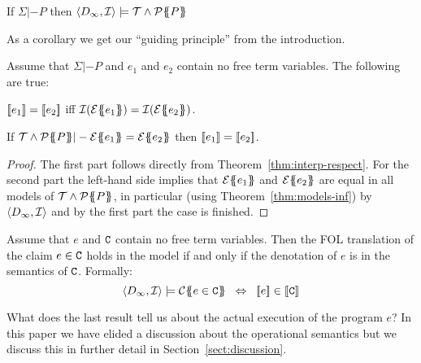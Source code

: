 \begin{theorem}\label{thm:models-inf}
If $\Sigma |- P$ then $\langle D_{\infty},{\cal I}\rangle \models {\cal T} \land {\cal P}\{\!\!\{P\}\!\!\}$
\end{theorem}
As a corollary we get our ``guiding principle'' from the introduction.
\begin{corollary}\label{cor:guiding-principle}
Assume that $\Sigma |- P$ and $e_1$ and $e_2$ contain no free term variables. The following
are true:
\begin{itemize*}
  \item $[\![e_1]\!] = [\![e_2]\!]$ iff ${\cal I}(\etrans{}{}{e_1}) = {\cal I}(\etrans{}{}{e_2})$.
  \item If $\Th \land \ptrans{\Sigma}{P} |- \etrans{}{}{e_1} = \etrans{}{}{e_2}$ then $[\![e_1]\!] = [\![e_2]\!]$.
\end{itemize*}
\end{corollary}
\begin{proof} The first part follows directly from Theorem~\ref{thm:interp-respect}.
For the second part the left-hand side implies that ${\cal E}\{\!\!\{e_1\}\!\!\}$ and ${\cal E}\{\!\!\{e_2\}\!\!\}$ are
equal in all models of ${\cal T} \land {\cal P}\{\!\!\{P\}\!\!\}$, in particular (using Theorem~\ref{thm:models-inf})
by $\langle D_{\infty},{\cal I}\rangle$ and by the first part the case is finished.
\end{proof}


\begin{theorem}\label{thm:den-contr-satisfaction} Assume that $e$ and ${\tt C}$ contain no free
term variables. Then the FOL translation of the claim $e \in {\tt C}$ holds in the model
if and only if the denotation of $e$ is in the semantics of ${\tt C}$.  Formally:
$$\langle D_\infty,{\cal I}\rangle \models \ctrans{}{\cdot}{e \in \Ct}
  \;\; \Leftrightarrow \;\; \dbrace{e} \in \dbrace{\Ct}
$$
\end{theorem}

What does the last result tell us about the actual execution of the program $e$? In this
paper we have elided a discussion about the operational semantics but we discuss this
in further detail in Section~\ref{sect:discussion}.

